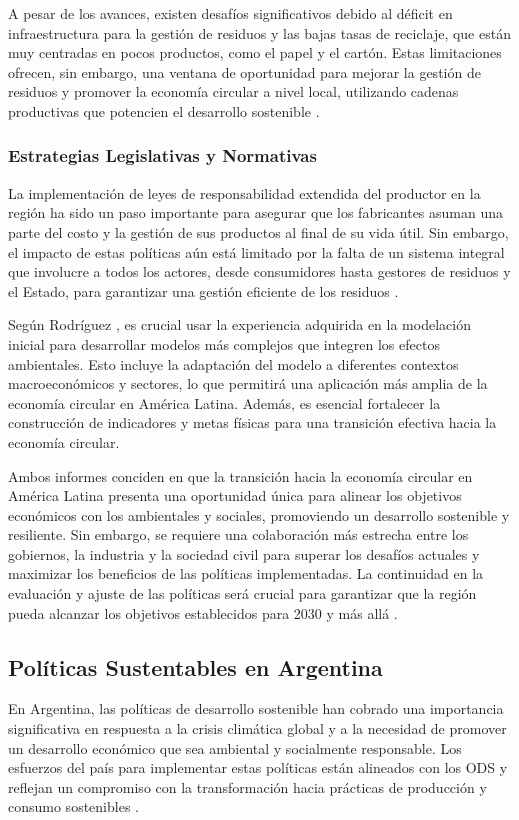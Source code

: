 \documentclass[main.tex]{subfiles}
\begin{document}
A pesar de los avances, existen desafíos significativos debido al déficit en infraestructura para la gestión de residuos y las bajas tasas de reciclaje, que están muy centradas en pocos productos, como el papel y el cartón. Estas limitaciones ofrecen, sin embargo, una ventana de oportunidad para mejorar la gestión de residuos y promover la economía circular a nivel local, utilizando cadenas productivas que potencien el desarrollo sostenible \cite{cepal2021economia}.

\subsubsection{Estrategias Legislativas y Normativas}
La implementación de leyes de responsabilidad extendida del productor en la región ha sido un paso importante para asegurar que los fabricantes asuman una parte del costo y la gestión de sus productos al final de su vida útil. Sin embargo, el impacto de estas políticas aún está limitado por la falta de un sistema integral que involucre a todos los actores, desde consumidores hasta gestores de residuos y el Estado, para garantizar una gestión eficiente de los residuos \cite{cepal2021economia}.

Según Rodríguez \cite{rodriguez2023modelamiento}, es crucial usar la experiencia adquirida en la modelación inicial para desarrollar modelos más complejos que integren los efectos ambientales. Esto incluye la adaptación del modelo a diferentes contextos macroeconómicos y sectores, lo que permitirá una aplicación más amplia de la economía circular en América Latina. Además, es esencial fortalecer la construcción de indicadores y metas físicas para una transición efectiva hacia la economía circular.

Ambos informes conciden en que la transición hacia la economía circular en América Latina presenta una oportunidad única para alinear los objetivos económicos con los ambientales y sociales, promoviendo un desarrollo sostenible y resiliente. Sin embargo, se requiere una colaboración más estrecha entre los gobiernos, la industria y la sociedad civil para superar los desafíos actuales y maximizar los beneficios de las políticas implementadas. La continuidad en la evaluación y ajuste de las políticas será crucial para garantizar que la región pueda alcanzar los objetivos establecidos para 2030 y más allá \cite{cepal2021economia}.

\subsection{Políticas Sustentables en Argentina}
En Argentina, las políticas de desarrollo sostenible han cobrado una importancia significativa en respuesta a la crisis climática global y a la necesidad de promover un desarrollo económico que sea ambiental y socialmente responsable. Los esfuerzos del país para implementar estas políticas están alineados con los ODS y reflejan un compromiso con la transformación hacia prácticas de producción y consumo sostenibles \cite{dormido2021fundar, sostenible2021argentina}.
\end{document}
